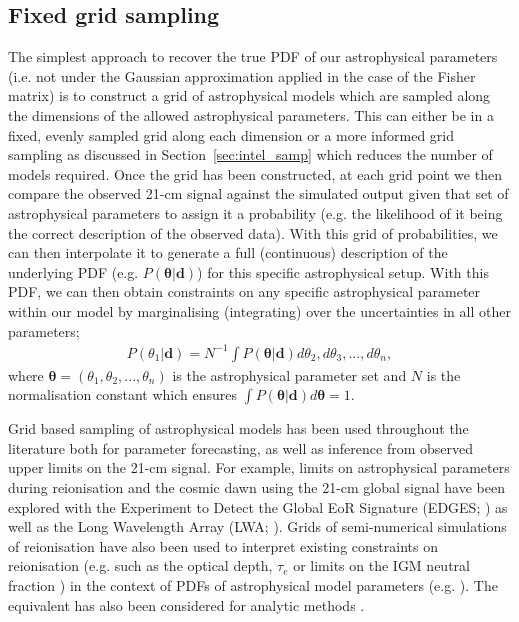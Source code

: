 \subsection{Fixed grid sampling}

The simplest approach to recover the true PDF of our astrophysical parameters (i.e. not under the Gaussian approximation applied in the case of the Fisher matrix) is to construct a grid of astrophysical models which are sampled along the dimensions of the allowed astrophysical parameters. This can either be in a fixed, evenly sampled grid along each dimension or a more informed grid sampling as discussed in Section~\ref{sec:intel_samp} which reduces the number of models required. Once the grid has been constructed, at each grid point we then compare the observed 21-cm signal against the simulated output given that set of astrophysical parameters to assign it a probability (e.g. the likelihood of it being the correct description of the observed data). With this grid of probabilities, we can then interpolate it to generate a full (continuous) description of the underlying PDF (e.g. $P(\mathbf{\theta}|\mathbf{d})$) for this specific astrophysical setup. With this PDF, we can then obtain constraints on any specific astrophysical parameter within our model by marginalising (integrating) over the uncertainties in all other parameters;
\begin{eqnarray}
P(\theta_{1}|\mathbf{d}) = N^{-1} \int P(\mathbf{\theta}|\mathbf{d}) d\theta_{2},d\theta_{3},...,d\theta_{n},
\end{eqnarray}
where $\mathbf{\theta} = (\theta_{1}, \theta_{2}, ..., \theta_{n})$ is the astrophysical parameter set and $N$ is the normalisation constant which ensures $\int P(\mathbf{\theta}|\mathbf{d}) d\mathbf{\theta} = 1$.

Grid based sampling of astrophysical models has been used throughout the literature both for parameter forecasting, as well as inference from observed upper limits on the 21-cm signal. For example, limits on astrophysical parameters during reionisation and the cosmic dawn using the 21-cm global signal have been explored with the Experiment to Detect the Global EoR Signature (EDGES; \cite{Monsalve:2017,Monsalve:2018,Monsalve:2019}) as well as the Long Wavelength Array (LWA; \cite{Fialkov:2019b}). Grids of semi-numerical simulations of reionisation have also been used to interpret existing constraints on reionisation (e.g. such as the optical depth, $\tau_{e}$ \cite{Planck:2018} or limits on the IGM neutral fraction \cite{McGreer:2015}) in the context of PDFs of astrophysical model parameters (e.g. \cite{Mesinger:2012,Mesinger:2013,Greig:2017a}). The equivalent has also been considered for analytic methods \cite{Choudhury:2005,Barkana:2009,Zahn:2012,Mirocha:2018}.

